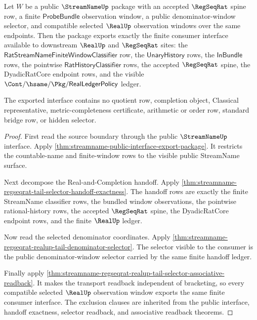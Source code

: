 \begin{theorem}
\label{thm:streamname-realup-tail-selector-public-interface}
Let $W$ be a public $\StreamNameUp$ package with an accepted $\RegSeqRat$
spine row, a finite $\mathsf{ProbeBundle}$ observation window, a public
denominator-window selector, and compatible selected $\RealUp$ observation
windows over the same endpoints. Then the package exports exactly the finite
consumer interface available to downstream $\RealUp$ and $\RegSeqRat$ sites:
the $\mathsf{RatStreamNameFiniteWindowClassifier}$ row, the
$\mathsf{UnaryHistory}$ rows, the $\mathsf{InBundle}$ rows, the pointwise
$\mathsf{RatHistoryClassifier}$ rows, the accepted $\RegSeqRat$ spine, the
DyadicRatCore endpoint rows, and the visible
$\Cont/\hsame/\Pkg/\mathsf{RealLedgerPolicy}$ ledger.

The exported interface contains no quotient row, completion object, Classical
representative, metric-completeness certificate, arithmetic or order row,
standard bridge row, or hidden selector.
\end{theorem}
\begin{proof}
First read the source boundary through the public $\StreamNameUp$ interface.
Apply \autoref{thm:streamname-public-interface-export-package}. It restricts
the countable-name and finite-window rows to the visible public StreamName
surface.

Next decompose the Real-and-Completion handoff. Apply
\autoref{thm:streamname-regseqrat-tail-selector-handoff-exactness}. The
handoff rows are exactly the finite StreamName classifier rows, the bundled
window observations, the pointwise rational-history rows, the accepted
$\RegSeqRat$ spine, the DyadicRatCore endpoint rows, and the finite
$\RealUp$ ledger.

Now read the selected denominator coordinates. Apply
\autoref{thm:streamname-regseqrat-realup-tail-denominator-selector}. The
selector visible to the consumer is the public denominator-window selector
carried by the same finite handoff ledger.

Finally apply
\autoref{thm:streamname-regseqrat-realup-tail-selector-associative-readback}.
It makes the transport readback independent of bracketing, so every compatible
selected $\RealUp$ observation window exports the same finite consumer
interface. The exclusion clauses are inherited from the public interface,
handoff exactness, selector readback, and associative readback theorems.
\end{proof}

